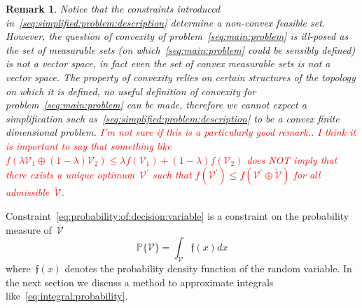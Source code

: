\documentclass[letterpaper, 10pt, conference]{ieeeconf} %
\newtheorem{rem}[thm]{Remark}
\begin{document}
\begin{rem}
Notice that the constraints introduced in~\eqref{seq:simplified:problem:description} determine a non-convex feasible set. 
%
However, the question of convexity of problem~\eqref{seq:main:problem} is ill-posed as the set of measurable sets (on which~\eqref{seq:main:problem} could be sensibly defined) is not a vector space, in fact even the set of convex measurable sets is not a vector space.
%
The property of convexity relies on certain structures of the topology on which it is defined, no useful definition of convexity for problem~\eqref{seq:main:problem} can be made, therefore we cannot expect a simplification such as~\eqref{seq:simplified:problem:description} to be a convex finite dimensional problem.
\textcolor{red}{I'm not sure if this is a particularly good remark.. I think it is important to say that something like~$f(\lambda\mathcal V_1\oplus(1-\lambda)\mathcal V_2)\leq\lambda f(\mathcal V_1)+(1-\lambda)f(\mathcal V_2)$ does NOT imply that there exists a unique optimum~$\mathcal V^\prime$ such that $f(\mathcal V^\prime)\leq f(\mathcal V^\prime\oplus\tilde{\mathcal V})$ for all admissible~$\tilde{\mathcal V}$.}
\end{rem}
%
\noindent Constraint~\eqref{eq:probability:of:decision:variable} is a constraint on the probability measure of~$\mathcal V$
%
\begin{equation}\label{eq:integral:probability}
	\mathbb P\{\mathcal V\} = \int_{\mathcal V}\mathfrak f(x)dx
\end{equation}
%
where~$\mathfrak f(x)$ denotes the probability density function of the random variable.
%
In the next section we discuss a method to approximate integrals like~\eqref{eq:integral:probability}.
\end{document}
